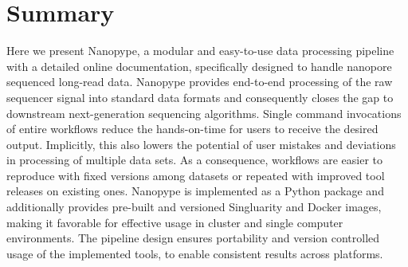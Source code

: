 



\section{Summary}
\label{sec:nanopype:summary}
Here we present Nanopype, a modular and easy-to-use data processing pipeline with a detailed online documentation, specifically designed to handle nanopore sequenced long-read data.
Nanopype provides end-to-end processing of the raw sequencer signal into standard data formats and consequently closes the gap to downstream next-generation sequencing algorithms. Single command invocations of entire workflows reduce the hands-on-time for users to receive the desired output. Implicitly, this also lowers the potential of user mistakes and deviations in processing of multiple data sets. As a consequence, workflows are easier to reproduce with fixed versions among datasets or repeated with improved tool releases on existing ones.
Nanopype is implemented as a Python package and additionally provides pre-built and versioned Singluarity and Docker images, making it favorable for effective usage in cluster and single computer environments. The pipeline design ensures portability and version controlled usage of the implemented tools, to enable consistent results across platforms.


